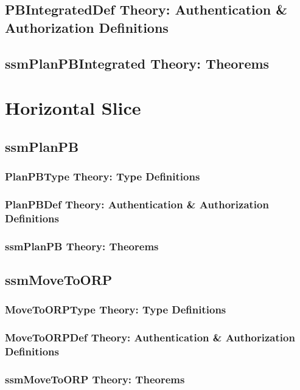 \documentclass[hidelinks,12pt,a4paper]{report}
\begin{document}
\begin{appendices}
\subsection{PBIntegratedDef Theory: Authentication \& Authorization Definitions}

\subsection{ssmPlanPBIntegrated Theory: Theorems}



\section{Horizontal Slice}
\subsection{ssmPlanPB}
\subsubsection{PlanPBType Theory: Type Definitions}

\subsubsection{PlanPBDef Theory: Authentication \& Authorization Definitions}

\subsubsection{ssmPlanPB Theory: Theorems}



\subsection{ssmMoveToORP}
\subsubsection{MoveToORPType Theory: Type Definitions}
\subsubsection{MoveToORPDef Theory: Authentication \& Authorization Definitions}
\subsubsection{ssmMoveToORP Theory: Theorems}



\end{appendices}
\end{document}
